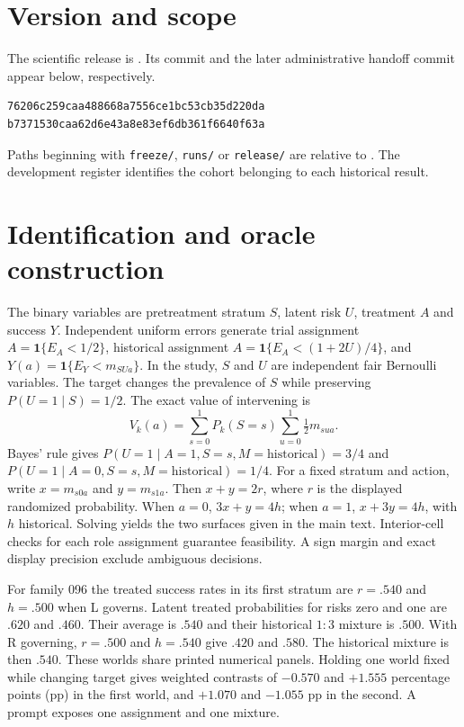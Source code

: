 

\begin{center}\emph{\projecttitle}\end{center}
\section{Version and scope}
The scientific release is \release. Its commit and the later administrative handoff commit appear below, respectively.
{\small\begin{verbatim}
76206c259caa488668a7556ce1bc53cb35d220da
b7371530caa62d6e43a8e83ef6db361f6640f63a
\end{verbatim}}
Paths beginning with \texttt{freeze/}, \texttt{runs/} or \texttt{release/} are relative to . The development register identifies the cohort belonging to each historical result.

\section{Identification and oracle construction}
The binary variables are pretreatment stratum $S$, latent risk $U$, treatment $A$ and success $Y$. Independent uniform errors generate trial assignment $A=\mathbf1\{E_A<1/2\}$, historical assignment $A=\mathbf1\{E_A<(1+2U)/4\}$, and $Y(a)=\mathbf1\{E_Y<m_{SUa}\}$. In the study, $S$ and $U$ are independent fair Bernoulli variables. The target changes the prevalence of $S$ while preserving $P(U=1\mid S)=1/2$. The exact value of intervening is
\[
V_k(a)=\sum_{s=0}^1P_k(S=s)\sum_{u=0}^1\tfrac12 m_{sua}.
\]
Bayes' rule gives $P(U=1\mid A=1,S=s,M=\mathrm{historical})=3/4$ and $P(U=1\mid A=0,S=s,M=\mathrm{historical})=1/4$. For a fixed stratum and action, write $x=m_{s0a}$ and $y=m_{s1a}$. Then $x+y=2r$, where $r$ is the displayed randomized probability. When $a=0$, $3x+y=4h$; when $a=1$, $x+3y=4h$, with $h$ historical. Solving yields the two surfaces given in the main text. Interior-cell checks for each role assignment guarantee feasibility. A sign margin and exact display precision exclude ambiguous decisions.

For family 096 the treated success rates in its first stratum are $r=.540$ and $h=.500$ when L governs. Latent treated probabilities for risks zero and one are $.620$ and $.460$. Their average is $.540$ and their historical $1:3$ mixture is $.500$. With R governing, $r=.500$ and $h=.540$ give $.420$ and $.580$. The historical mixture is then $.540$. These worlds share printed numerical panels. Holding one world fixed while changing target gives weighted contrasts of $-0.570$ and $+1.555$ percentage points (pp) in the first world, and $+1.070$ and $-1.055$ pp in the second. A prompt exposes one assignment and one mixture.

